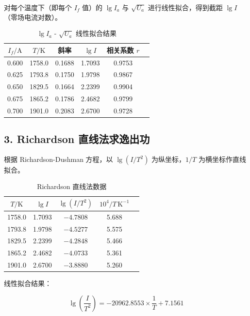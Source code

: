 \documentclass[UTF8,a4paper,zihao=-4]{ctexart}
\begin{document}
对每个温度下（即每个 $I_f$ 值）的 $\lg I_a$ 与 $\sqrt{U_a}$ 进行线性拟合，得到截距 $\lg I$（零场电流对数）。

\begin{table}[H]
    \centering
    \caption{$\lg I_a$ - $\sqrt{U_a}$ 线性拟合结果}
    \renewcommand{\arraystretch}{1.3}
    \begin{tabular}{cccccc}
        \hline
        $I_f/\text{A}$ & $T/\text{K}$ & 斜率 & $\lg I$ & 相关系数 $r$ \\
        \hline
        0.600 & 1758.0 & 0.1688 & 1.7093 & 0.9753 \\
        0.625 & 1793.8 & 0.1750 & 1.9798 & 0.9867 \\
        0.650 & 1829.5 & 0.1664 & 2.2399 & 0.9904 \\
        0.675 & 1865.2 & 0.1786 & 2.4682 & 0.9799 \\
        0.700 & 1901.0 & 0.2083 & 2.6700 & 0.9728 \\
        \hline
    \end{tabular}
\end{table}

\subsection*{3. Richardson 直线法求逸出功}

根据 Richardson-Dushman 方程，以 $\lg(I/T^2)$ 为纵坐标，$1/T$ 为横坐标作直线拟合。

\begin{table}[H]
    \centering
    \caption{Richardson 直线法数据}
    \renewcommand{\arraystretch}{1.3}
    \begin{tabular}{ccccc}
        \hline
        $T/\text{K}$ & $\lg I$ & $\lg(I/T^2)$ & $10^4/T\,\text{K}^{-1}$ \\
        \hline
        1758.0 & 1.7093 & $-4.7808$ & 5.688 \\
        1793.8 & 1.9798 & $-4.5277$ & 5.575 \\
        1829.5 & 2.2399 & $-4.2848$ & 5.466 \\
        1865.2 & 2.4682 & $-4.0733$ & 5.361 \\
        1901.0 & 2.6700 & $-3.8880$ & 5.260 \\
        \hline
    \end{tabular}
\end{table}

线性拟合结果：

\begin{equation}
    \lg\left(\frac{I}{T^2}\right) = -20962.8553 \times \frac{1}{T} + 7.1561
\end{equation}
\end{document}
